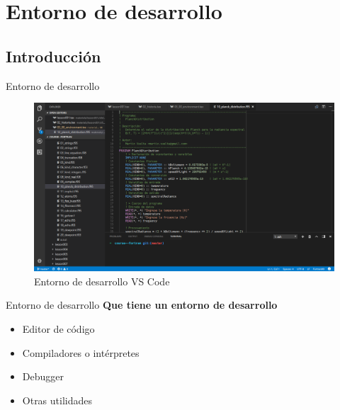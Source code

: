 \section{Entorno de desarrollo}


\subsection{Introducción}

\begin{frame}[fragile]{Entorno de desarrollo}
  \begin{figure}
      \includegraphics[width=1\textwidth]{./resources/IDE-VSCODE.png}
      \caption{Entorno de desarrollo VS Code}
  \end{figure}
\end{frame}

\begin{frame}[fragile]{Entorno de desarrollo}
  \textbf{Que tiene un entorno de desarrollo}
  \begin{itemize}[<+(1)->]
    \item Editor de código
    \item Compiladores o intérpretes
    \item Debugger
    \item Otras utilidades
  \end{itemize}
\end{frame}


